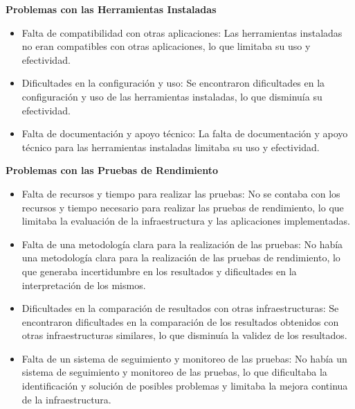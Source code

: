 \begin{spacing}{1.5}
    \textbf{Problemas con las Herramientas Instaladas}

    \begin{itemize}
        \item Falta de compatibilidad con otras aplicaciones: Las herramientas instaladas no eran compatibles con otras aplicaciones, lo que limitaba su uso y efectividad.
        \item Dificultades en la configuración y uso: Se encontraron dificultades en la configuración y uso de las herramientas instaladas, lo que disminuía su efectividad.
        \item Falta de documentación y apoyo técnico: La falta de documentación y apoyo técnico para las herramientas instaladas limitaba su uso y efectividad.
    \end{itemize}

    \textbf{Problemas con las Pruebas de Rendimiento}

    \begin{itemize}
        \item Falta de recursos y tiempo para realizar las pruebas: No se contaba con los recursos y tiempo necesario para realizar las pruebas de rendimiento, lo que limitaba la evaluación de la infraestructura y las aplicaciones implementadas.
        \item Falta de una metodología clara para la realización de las pruebas: No había una metodología clara para la realización de las pruebas de rendimiento, lo que generaba incertidumbre en los resultados y dificultades en la interpretación de los mismos.
        \item Dificultades en la comparación de resultados con otras infraestructuras: Se encontraron dificultades en la comparación de los resultados obtenidos con otras infraestructuras similares, lo que disminuía la validez de los resultados.
        \item Falta de un sistema de seguimiento y monitoreo de las pruebas: No había un sistema de seguimiento y monitoreo de las pruebas, lo que dificultaba la identificación y solución de posibles problemas y limitaba la mejora continua de la infraestructura.
    \end{itemize}

    
\mylinespacing
\mylinespacing
\begin{tightcenter}
\end{tightcenter}
\end{spacing}
